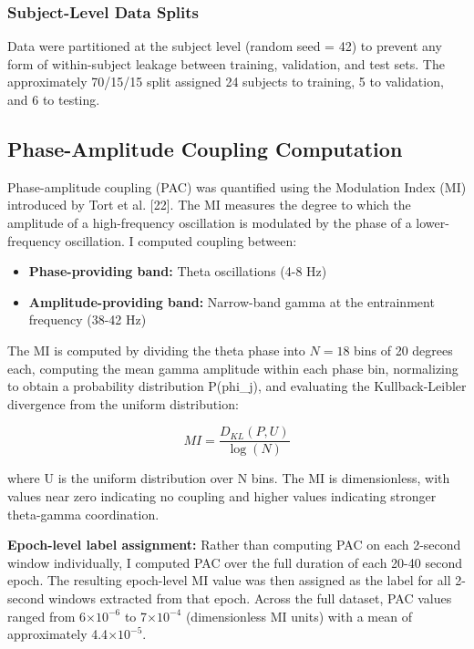 \documentclass[11pt,letterpaper]{article}
\begin{document}
\subsubsection{Subject-Level Data Splits}

Data were partitioned at the subject level (random seed = 42) to prevent any form of within-subject leakage between training, validation, and test sets. The approximately 70/15/15 split assigned 24 subjects to training, 5 to validation, and 6 to testing.

\subsection{Phase-Amplitude Coupling Computation}

Phase-amplitude coupling (PAC) was quantified using the Modulation Index (MI) introduced by Tort et al. [22]. The MI measures the degree to which the amplitude of a high-frequency oscillation is modulated by the phase of a lower-frequency oscillation. I computed coupling between:

\begin{itemize}[nosep]
  \item \textbf{Phase-providing band:} Theta oscillations (4-8 Hz)
  \item \textbf{Amplitude-providing band:} Narrow-band gamma at the entrainment frequency (38-42 Hz)
\end{itemize}

The MI is computed by dividing the theta phase into $N = 18$ bins of 20 degrees each, computing the mean gamma amplitude within each phase bin, normalizing to obtain a probability distribution P(phi\_j), and evaluating the Kullback-Leibler divergence from the uniform distribution:

\begin{equation}
  MI = \frac{D_{KL}(P, U)}{\log(N)}
\end{equation}

where U is the uniform distribution over N bins. The MI is dimensionless, with values near zero indicating no coupling and higher values indicating stronger theta-gamma coordination.

\textbf{Epoch-level label assignment:} Rather than computing PAC on each 2-second window individually, I computed PAC over the full duration of each 20-40 second epoch. The resulting epoch-level MI value was then assigned as the label for all 2-second windows extracted from that epoch. Across the full dataset, PAC values ranged from 6$\times 10^{-6}$ to 7$\times 10^{-4}$ (dimensionless MI units) with a mean of approximately 4.4$\times 10^{-5}$.
\end{document}
